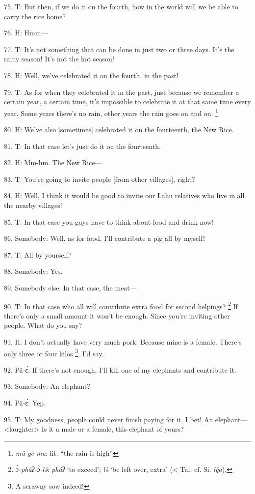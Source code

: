 75. T: But then, if we do it on the fourth, how in the world will we be able to
carry the rice home?

76. H: Hmm---

77. T: It's not something that can be done in just two or three days.  It's the
rainy season!  It's not the hot season!

78. H: Well, we've celebrated it on the fourth, in the past!

79. T: As for when they celebrated it in the past, just because we remember a certain
year, a certain time, it's impossible to celebrate it at that same time every year.
Some years there's no rain, other years the rain goes on and on. \footnote{\textit{mû-yè mu}: lit. ``the rain is high''}

80. H: We've also [sometimes] celebrated it on the fourteenth, the New Rice.

81. T: In that case let's just do it on the fourteenth.

82. H: Mm-hm.  The New Rice---

83. T: You're going to invite people [from other villages], right?

84. H: Well, I think it would be good to invite our Lahu relatives who live in
all the nearby villages!

85. T: In that case you guys have to think about food and drink now!

86. Somebody: Well, as for food, I'll contribute a pig all by myself!

87. T: All by yourself?

88. Somebody: Yes.

89. Somebody else: In that case, the meat---

90. T: In that case who all will contribute extra food for second helpings? \footnote{\textit{ ɔ̀-phâʔ-ɔ̀-lə́}: \textit{phâʔ} `to exceed'; \textit{lə́} `be left over, extra' (< Tai; cf. Si. \textit{ly̌a}).}
If there's only a small amount it won't be enough.  Since you're inviting other
people.  What do you say?

91. H: I don't actually have very much pork.  Because mine is a female.  There's
only three or four kilos \footnote{A scrawny sow indeed!}, I'd say.

92. Pā-ɛ́: If there's not enough, I'll kill one of my elephants and contribute
it.

93. Somebody: An elephant?

94. Pā-ɛ́: Yep.

95. T: My goodness, people could never finish paying for it, I bet!  An elephant---<laughter>
Is it a male or a female, this elephant of yours?

